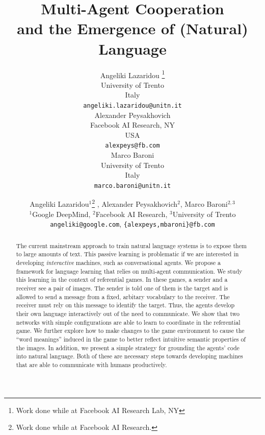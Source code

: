 \documentclass{article} %
\title{Multi-Agent Cooperation \\and the Emergence of (Natural) Language}
\author{Angeliki Lazaridou \thanks{Work done while at Facebook AI Research Lab, NY} \\
University of Trento\\
Italy\\
\texttt{angeliki.lazaridou@unitn.it} \\
\And
Alexander Peysakhovich \\
Facebook AI Research, NY \\
USA \\
\texttt{alexpeys@fb.com} \\
\AND
Marco Baroni\\
University of Trento\\
Italy\\
\texttt{marco.baroni@unitn.it} \\
}
\author{Angeliki Lazaridou$^{1}$\thanks{Work done while at Facebook AI Research.} , Alexander Peysakhovich$^2$, Marco Baroni$^{2,3}$\\
$^1$Google DeepMind, $^2$Facebook AI Research, $^3$University of Trento\\
\texttt{angeliki@google.com}, \texttt{\{alexpeys,mbaroni\}@fb.com}
}
\begin{document}
\maketitle

\begin{abstract}
  The current mainstream approach to train natural language systems is
  to expose them to large amounts of text. This passive learning is
  problematic if we are interested in developing \emph{interactive}
  machines, such as conversational agents. We propose a framework for
  language learning that relies on multi-agent communication. We study this learning in the context of referential games.   In these games, a sender and a
  receiver see a pair of images. %
   The sender is told one of them is the target and is allowed to send a message from a
   fixed, arbitary vocabulary to the receiver. 
   The receiver must rely on this message to identify the target. 
   Thus, the  agents develop their own language interactively out of the need to
  communicate. We show that two networks with simple
  configurations are able to learn to coordinate in the referential
  game. We further explore how to make changes to the game environment to cause the ``word meanings'' induced in
  the game to better reflect intuitive semantic properties of the images. In addition, we present a simple strategy for grounding the
  agents' code into natural language. 
  Both of these are necessary steps towards developing machines that are able to
  communicate with humans productively. %
\end{abstract}
\end{document}
